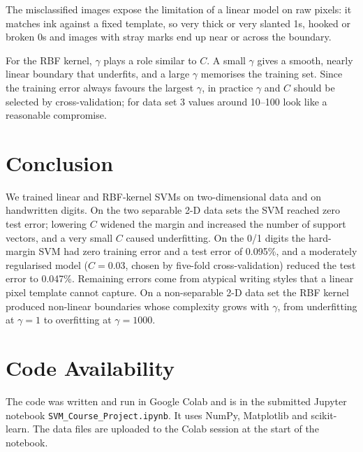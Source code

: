 \documentclass[conference,a4paper]{IEEEtran}
\begin{document}
The misclassified images expose the limitation of a linear model on raw pixels: it matches ink against a fixed template, so very thick or
very slanted 1s, hooked or broken 0s and images with stray marks end up near or across the boundary.

For the RBF kernel, $\gamma$ plays a role similar to $C$. A small $\gamma$ gives a smooth, nearly linear boundary that underfits, and
a large $\gamma$ memorises the training set. Since the training error always favours the largest $\gamma$, in practice $\gamma$ and $C$ should
be selected by cross-validation; for data set 3 values around 10--100 look like a reasonable compromise.

\section{Conclusion}
We trained linear and RBF-kernel SVMs on two-dimensional data and on handwritten digits. On the two separable 2-D data sets
the SVM reached zero test error; lowering $C$ widened the margin and increased the number of support vectors, and a very small $C$ caused
underfitting. On the 0/1 digits the hard-margin SVM had zero training error and a test error of 0.095\%, and a moderately regularised model
($C=0.03$, chosen by five-fold cross-validation) reduced the test error to 0.047\%. Remaining errors come from atypical writing styles that a
linear pixel template cannot capture. On a non-separable 2-D data set the RBF kernel produced non-linear boundaries whose complexity grows with
$\gamma$, from underfitting at $\gamma=1$ to overfitting at $\gamma=1000$.

\FloatBarrier
\section*{Code Availability}
The code was written and run in Google Colab and is in the submitted Jupyter notebook \texttt{SVM\_Course\_Project.ipynb}. It uses NumPy, Matplotlib and scikit-learn.
The data files are uploaded to the Colab session at the start of the notebook.



\end{document}
